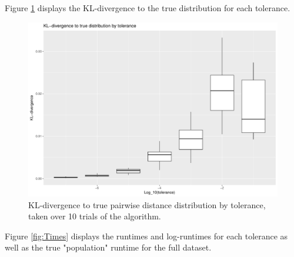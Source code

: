 \documentclass{article}
\begin{document}
Figure \ref{fig:Divergences} displays the KL-divergence to the true distribution for each tolerance.
\begin{figure}
    \includegraphics[width=\linewidth]{Figures/div_by_tol.pdf}
    \caption{KL-divergence to true pairwise distance distribution by tolerance, taken over 10 trials of the algorithm.}
    \label{fig:Divergences}
\end{figure}
Figure \ref{fig:Times} displays the runtimes and log-runtimes for each tolerance as well as the true "population" runtime for the full dataset.
\end{document}
